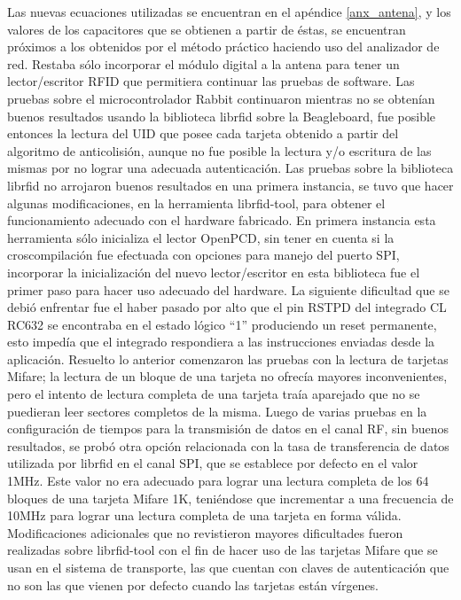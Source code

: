 Las nuevas ecuaciones utilizadas se encuentran en el apéndice \ref{anx_antena}, y los valores de los capacitores que se obtienen a partir de éstas, se encuentran próximos a los obtenidos por el método práctico haciendo uso del analizador de red.
Restaba sólo incorporar el módulo digital a la antena para tener un lector/escritor RFID que permitiera continuar las pruebas de software.
Las pruebas sobre el microcontrolador Rabbit continuaron mientras no se obtenían buenos resultados usando la biblioteca librfid sobre la Beagleboard, fue posible entonces la lectura del UID que posee cada tarjeta obtenido a partir del algoritmo de anticolisión, aunque no fue posible la lectura y/o escritura de las mismas por no lograr una adecuada autenticación.
Las pruebas sobre la biblioteca librfid no arrojaron buenos resultados en una primera instancia, se tuvo que hacer algunas modificaciones, en la herramienta librfid-tool, para obtener el funcionamiento adecuado con el hardware fabricado. En primera instancia esta herramienta sólo inicializa el lector OpenPCD, sin tener en cuenta si la croscompilación fue efectuada con opciones para manejo del puerto SPI, incorporar la inicialización del nuevo lector/escritor en esta biblioteca fue el primer paso para hacer uso adecuado del hardware. 
La siguiente dificultad que se debió enfrentar fue el haber pasado por alto que el pin RSTPD del integrado CL RC632 se encontraba en el estado lógico “1” produciendo un reset permanente, esto impedía que el integrado respondiera a las instrucciones enviadas desde la aplicación.
Resuelto lo anterior comenzaron las pruebas con la lectura de tarjetas Mifare; la lectura de un bloque de una tarjeta no ofrecía mayores inconvenientes, pero el intento de lectura completa de una tarjeta traía aparejado que no se puedieran leer sectores completos de la misma. Luego de varias pruebas en la configuración de tiempos para la transmisión de datos en el canal RF, sin buenos resultados, se probó otra opción relacionada con la tasa de transferencia de datos utilizada por librfid en el canal SPI, que se establece por defecto en el valor 1MHz. Este valor no era adecuado para lograr una lectura completa de los 64 bloques de una tarjeta Mifare 1K, teniéndose que incrementar a una frecuencia de 10MHz para lograr una lectura completa de una tarjeta en forma válida.
Modificaciones adicionales que no revistieron mayores dificultades fueron realizadas sobre librfid-tool con el fin de hacer uso de las tarjetas Mifare que se usan en el sistema de transporte, las que cuentan con claves de autenticación que no son las que vienen por defecto cuando las tarjetas están vírgenes. 